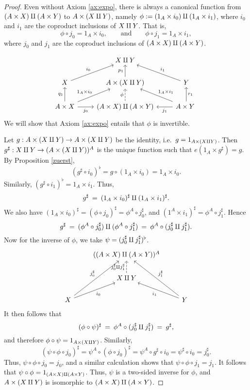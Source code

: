 \begin{proof} Even without Axiom \ref{ax:expo}, there is always a
  canonical function from $(A\times X)\amalg (A\times Y)$ to $A\times
  (X\amalg Y)$, namely $\phi :=(1_A\times i_0)\amalg (1_A\times i_1)$, where $i_0$
  and $i_1$ are the coproduct inclusions of $X\amalg Y$.  That is,
  \[ \phi \circ j_0=1_A\times i_0,\qquad \text{and} \qquad \phi\circ
  j_1=1_A\times i_1 ,\] where $j_0$ and $j_1$ are the coproduct
  inclusions of $(A\times X)\amalg (A\times Y)$. 

\[ \begin{tikzcd}
 & X\cpr Y  \\
X \arrow[ur,"i_0"]  &  A\times (X\cpr Y) \arrow[u,"p_1"] &  Y
\arrow[ul,"i_1"'] \\
A\times X \arrow[ur,"1_A\times i_0"] \arrow[r,"j_0"'] \arrow[u,"q_1"]  &  (A\times X)\cpr (A\times
Y) \arrow[dashed,u,"\phi"] & A\times Y
\arrow[l,"j_1"] \arrow[ul,"1_A\times i_1"'] \arrow[u,"r_1"'] \
\end{tikzcd} \] We will show that Axiom \ref{ax:expo} entails that
$\phi$ is invertible.  

Let $g:A\times (X\amalg Y)\to A\times (X\amalg Y)$ be the identity, i.e.\
$g=1_{A\times (X\amalg Y)}$.  Then $g^\sharp :X\amalg Y\to (A\times (X\amalg
Y))^A$ is the unique function such that $e(1_A\times g^\sharp)=g$.  By
Proposition \ref{zuerst},
\[ (g^\sharp \circ i_0)^\flat = g\circ (1_A\times i_0) = 1_A\times i_0
.\]  Similarly, $(g^\sharp\circ i_1)^\flat = 1_A\times i_1$.  Thus,
\[ g^\sharp \: = \: (1_A\times i_0 )^\sharp \amalg  (1_A\times i_1)^\sharp
.\] We also have $(1_A\times i_0)^\sharp = (\phi\circ j_0 )^{\sharp} =
\phi ^A\circ j_0^\sharp$, and $(1^A\times i_1)^\sharp = \phi ^A\circ
j_1^\sharp$.  Hence
\[ g^\sharp \: = \: (\phi ^A\circ j_0^\sharp ) \amalg  (\phi ^A\circ
j_1^\sharp ) \: = \: \phi ^A\circ (j_0^\sharp \amalg j_1^\sharp ) .\] Now
for the inverse of $\phi$, we take $\psi = (j_0^\sharp\amalg j_1^\sharp
)^\flat$.
\[ \begin{tikzcd}
& ((A\times X)\cpr (A\times Y))^A \\
& X\cpr Y \arrow[dashed,u,"j_0^\sharp\cpr j_1^\sharp"] \\
X \arrow[ur,"i_0"'] \arrow[uur,"j_0^\sharp"] & & Y
\arrow[uul,"j_1^\sharp"'] \arrow[ul,"i_1"] \end{tikzcd} \] It then follows that
\[ (\phi \circ \psi )^\sharp \:=\: \phi ^A\circ (j_0^\sharp
\amalg j_1^\sharp ) \: = \: g^\sharp , \] and therefore $\phi\circ\psi
=1_{A\times (X\amalg Y)}$.  Similarly, \[ (\psi\circ\phi\circ
j_0)^\sharp=\psi ^A\circ (\phi \circ j_0)^\sharp = \psi ^A\circ
g^\sharp\circ i_0 = \psi^\sharp\circ i_0= j_0^\sharp . \] Thus,
$\psi\circ\phi\circ j_0=j_0$, and a similar calculation shows that
$\psi\circ\phi\circ j_1=j_1$.  It follows that $\psi\circ\phi
=1_{(A\times X)\amalg (A\times Y)}$.  Thus, $\psi$ is a two-sided inverse
for $\phi$, and $A\times (X\amalg Y)$ is isomorphic to $(A\times X)\amalg (A\times
Y)$. \end{proof}

